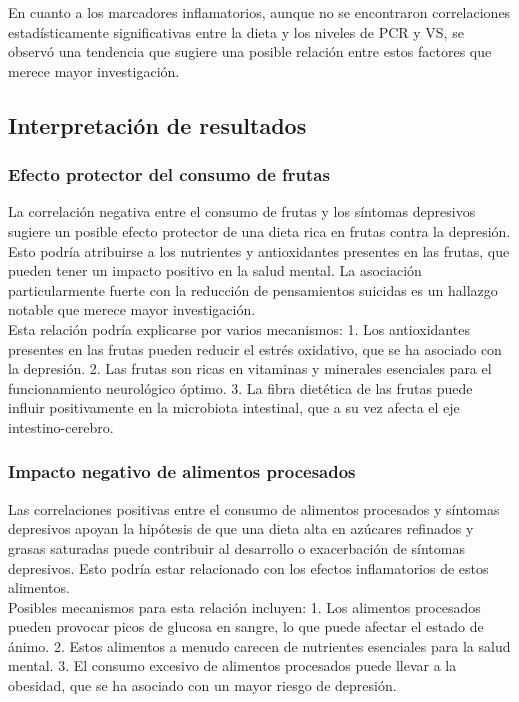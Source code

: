\documentclass[stu, 12pt]{apa7}
\begin{document}
	En cuanto a los marcadores inflamatorios, aunque no se encontraron
	correlaciones estadísticamente significativas entre la dieta y los niveles de
	PCR y VS, se observó una tendencia que sugiere una posible relación
	entre estos factores que merece mayor investigación.


	\subsection{Interpretación de resultados}\label{interpretaciuxf3n-de-resultados}

	\subsubsection{Efecto protector del consumo de frutas}

	La correlación negativa entre el consumo de frutas y los síntomas
	depresivos sugiere un posible efecto protector de una dieta rica en
	frutas contra la depresión. Esto podría atribuirse a los nutrientes y
	antioxidantes presentes en las frutas, que pueden tener un impacto
	positivo en la salud mental. La asociación particularmente fuerte con la
	reducción de pensamientos suicidas es un hallazgo notable que merece
	mayor investigación.\\

	Esta relación podría explicarse por varios mecanismos: 1. Los antioxidantes presentes en las frutas pueden reducir el estrés oxidativo, que se ha asociado con la depresión. 2. Las frutas son ricas en vitaminas y minerales esenciales para el funcionamiento neurológico óptimo. 3. La fibra dietética de las frutas puede influir positivamente en la microbiota intestinal, que a su vez afecta el eje intestino-cerebro.


	\subsubsection{Impacto negativo de alimentos procesados}\label{impacto-negativo-de-alimentos-procesados}

	Las correlaciones positivas entre el consumo de alimentos procesados y
	síntomas depresivos apoyan la hipótesis de que una dieta alta en
	azúcares refinados y grasas saturadas puede contribuir al desarrollo o
	exacerbación de síntomas depresivos. Esto podría estar relacionado con
	los efectos inflamatorios de estos alimentos.\\

	Posibles mecanismos para esta relación incluyen: 1. Los alimentos procesados pueden provocar picos de glucosa en sangre, lo que puede afectar el estado de ánimo. 2. Estos alimentos a menudo carecen de nutrientes esenciales para la salud mental. 3.  El consumo excesivo de alimentos procesados puede llevar a la obesidad, que se ha asociado con un mayor riesgo de depresión.
	
\end{document}
